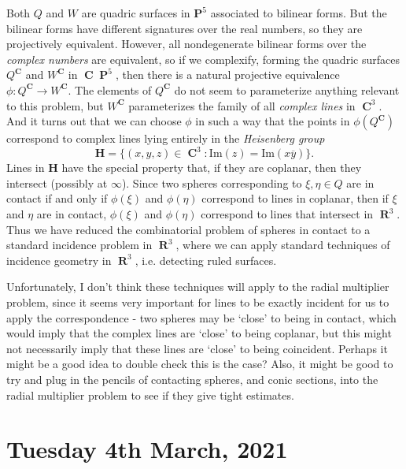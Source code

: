 \documentclass[openany,nobib,nols,a4paper,twoside,symmetric,justified,notoc]{tufte-book}
\theoremstyle{plain}
\theoremstyle{remark}
\theoremstyle{definition}
\newcommand{\currentchapter}{}
\let\oldchapter\chapter
\renewcommand{\chapter}[1]{\oldchapter{#1}\renewcommand{\currentchapter}{#1}}
\DeclareMathOperator{\RR}{\mathbf{R}}
\DeclareMathOperator{\CC}{\mathbf{C}}
\DeclareMathOperator{\PP}{\mathbf{P}}
\begin{document}
Both $Q$ and $W$ are quadric surfaces in $\mathbf{P}^5$ associated to bilinear forms. But the bilinear forms have different signatures over the real numbers, so they are projectively equivalent. However, all nondegenerate bilinear forms over the \emph{complex numbers} are equivalent, so if we complexify, forming the quadric surfaces $Q^{\mathbf{C}}$ and $W^{\mathbf{C}}$ in $\CC \PP^5$, then there is a natural projective equivalence $\phi: Q^{\mathbf{C}} \to W^{\mathbf{C}}$. The elements of $Q^{\mathbf{C}}$ do not seem to parameterize anything relevant to this problem, but $W^{\mathbf{C}}$ parameterizes the family of all \emph{complex lines} in $\CC^3$. And it turns out that we can choose $\phi$ in such a way that the points in $\phi(Q^{\CC})$ correspond to complex lines lying entirely in the \emph{Heisenberg group}
%
\[ \mathbf{H} = \{ (x,y,z) \in \CC^3: \text{Im}(z) = \text{Im}(x\overline{y}) \}. \]
%
Lines in $\mathbf{H}$ have the special property that, if they are coplanar, then they intersect (possibly at $\infty$). Since two spheres corresponding to $\xi,\eta \in Q$ are in contact if and only if $\phi(\xi)$ and $\phi(\eta)$ correspond to lines in coplanar, then if $\xi$ and $\eta$ are in contact, $\phi(\xi)$ and $\phi(\eta)$ correspond to lines that intersect in $\RR^3$. Thus we have reduced the combinatorial problem of spheres in contact to a standard incidence problem in $\RR^3$, where we can apply standard techniques of incidence geometry in $\RR^3$, i.e. detecting ruled surfaces.

Unfortunately, I don't think these techniques will apply to the radial multiplier problem, since it seems very important for lines to be exactly incident for us to apply the correspondence - two spheres may be `close' to being in contact, which would imply that the complex lines are `close' to being coplanar, but this might not necessarily imply that these lines are `close' to being coincident. Perhaps it might be a good idea to double check this is the case? Also, it might be good to try and plug in the pencils of contacting spheres, and conic sections, into the radial multiplier problem to see if they give tight estimates.









\chapter{Tuesday 4th March, 2021} \label{04032021}
\end{document}
